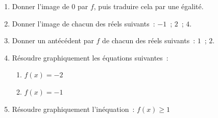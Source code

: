 \documentclass[12pt,a4paper]{article}
\begin{document}
\begin{enumerate}
  \item Donner l'image de $0$ par $f$, puis traduire cela par une égalité.
  \item Donner l'image de chacun des réels suivants~: $-1$~; $2$~; $4$.
  \item Donner un antécédent par $f$ de chacun des réels suivants~: $1$~; $2$.
  \item Résoudre graphiquement les équations suivantes~:
  \begin{enumerate}[label=\alph*.]
    \item $f(x) = -2$
    \item $f(x) = -1$
  \end{enumerate}
  \item Résoudre graphiquement l'inéquation~: $f(x) \geqslant 1$
\end{enumerate}
\end{document}
